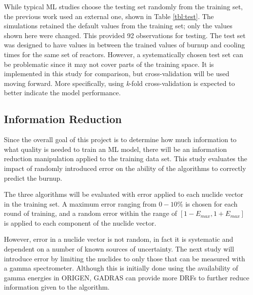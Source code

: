 While typical \gls{ML} studies choose the testing set randomly from the
training set, the previous work used an external one, shown in Table
\ref{tbl:test}.  The simulations retained the default values from the training
set; only the values shown here were changed. This provided 92 observations for
testing.  The test set was designed to have values in between the trained
values of burnup and cooling times for the same set of reactors.  However, a
systematically chosen test set can be problematic since it may not cover parts
of the training space.  It is implemented in this study for comparison, but
cross-validation will be used moving forward. More specifically, using
\textit{k}-fold cross-validation is expected to better indicate the model
performance. 

\subsection{Information Reduction}
\label{sec:inforeduc}

Since the overall goal of this project is to determine how much information to
what quality is needed to train an \gls{ML} model, there will be an
information reduction manipulation applied to the training data set. This study
evaluates the impact of randomly introduced error on the ability of the
algorithms to correctly predict the burnup. 

The three algorithms will be evaluated with error applied to each nuclide
vector in the training set.  A maximum error ranging from $0 - 10\%$ is chosen
for each round of training, and a random error within the range of $[1-E_{max},
1+E_{max}]$ is applied to each component of the nuclide vector.

However, error in a nuclide vector is not random, in fact it is systematic and
dependent on a number of known sources of uncertainty. The next study will
introduce error by limiting the nuclides to only those that can be measured
with a gamma spectrometer. Although this is initially done using the
availability of gamma energies in \gls{ORIGEN}, \gls{GADRAS} can provide more
\gls{DRF}s to further reduce information given to the algorithm.

